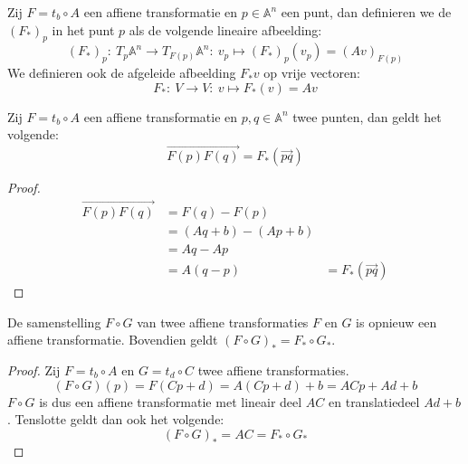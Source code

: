 \documentclass[main.tex]{subfiles}
\begin{document}
\begin{de}
  Zij $F = t_{b} \circ A$ een affiene transformatie en $p\in \mathbb{A}^{n}$ een punt, dan definieren we de  $(F_{*})_{p}$ in het punt $p$ als de volgende lineaire afbeelding:
  \[ (F_{*})_{p}:\ T_{p}\mathbb{A}^{n} \rightarrow T_{F(p)}\mathbb{A}^{n}:\ v_{p} \mapsto (F_{*})_{p}(v_{p}) = (Av)_{F(p)} \]
  We definieren ook de afgeleide afbeelding $F_{*}v$ op vrije vectoren:
  \[ F_{*}:\ V\rightarrow V:\ v\mapsto F_{*}(v) = Av \]
\end{de}

\begin{st}
  Zij $F = t_{b} \circ A$ een affiene transformatie en $p,q \in \mathbb{A}^{n}$ twee punten, dan geldt het volgende:
  \[ \overrightarrow{F(p)F(q)} = F_{*}(\overrightarrow{pq}) \]

  \begin{proof}
    \[
    \begin{array}{rll}
      \overrightarrow{F(p)F(q)} &= F(q) - F(p) &\\
                                &= (Aq+b) - (Ap+b) &\\
                                &= Aq - Ap &\\
                                &= A(q-p) &= F_{*}(\overrightarrow{pq})
    \end{array}
    \]
  \end{proof}
\end{st}

\begin{st}
  \label{st:samenstelling-affiene-transformatie-intern}
  De samenstelling $F\circ G$ van twee affiene transformaties $F$ en $G$ is opnieuw een affiene transformatie.
  Bovendien geldt $(F\circ G)_{*} = F_{*} \circ G_{*}$.

  \begin{proof}
    Zij $F = t_{b} \circ A$ en $G = t_{d} \circ C$ twee affiene transformaties.
    \[ (F\circ G)(p) = F(Cp + d) = A(Cp + d) + b = ACp + Ad + b \]
    $F\circ G$ is dus een affiene transformatie met lineair deel $AC$ en translatiedeel $Ad + b$.
    Tenslotte geldt dan ook het volgende:
    \[ (F\circ G)_{*} = AC = F_{*} \circ G_{*} \]
  \end{proof}
\end{st}
\end{document}

